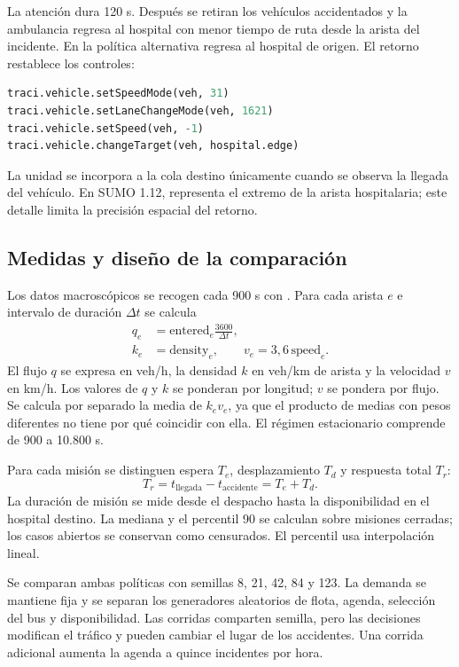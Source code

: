 \documentclass[conference,a4paper]{IEEEtran}
\newcommand{\archivo}[1]{\texttt{\detokenize{#1}}}
\begin{document}
La atención dura 120 s. Después se retiran los vehículos accidentados y la ambulancia regresa al hospital con menor tiempo de ruta desde la arista del incidente. En la política alternativa regresa al hospital de origen. El retorno restablece los controles:
\begin{lstlisting}[language=Python]
traci.vehicle.setSpeedMode(veh, 31)
traci.vehicle.setLaneChangeMode(veh, 1621)
traci.vehicle.setSpeed(veh, -1)
traci.vehicle.changeTarget(veh, hospital.edge)
\end{lstlisting}
La unidad se incorpora a la cola destino únicamente cuando se observa la llegada del vehículo. En SUMO 1.12, \archivo{arrivalPos=max} representa el extremo de la arista hospitalaria; este detalle limita la precisión espacial del retorno.

\subsection{Medidas y diseño de la comparación}
Los datos macroscópicos se recogen cada 900 s con \archivo{edgeData}\cite{macro}. Para cada arista $e$ e intervalo de duración $\Delta t$ se calcula
\begin{align}
q_e&=\mathrm{entered}_e\frac{3600}{\Delta t},\\
k_e&=\mathrm{density}_e,\qquad v_e=3{,}6\,\mathrm{speed}_e.
\end{align}
El flujo $q$ se expresa en veh/h, la densidad $k$ en veh/km de arista y la velocidad $v$ en km/h. Los valores de $q$ y $k$ se ponderan por longitud; $v$ se pondera por flujo. Se calcula por separado la media de $k_e v_e$, ya que el producto de medias con pesos diferentes no tiene por qué coincidir con ella. El régimen estacionario comprende de 900 a 10.800 s.

Para cada misión se distinguen espera $T_e$, desplazamiento $T_d$ y respuesta total $T_r$:
\begin{equation}
T_r=t_{\mathrm{llegada}}-t_{\mathrm{accidente}}=T_e+T_d.
\end{equation}
La duración de misión se mide desde el despacho hasta la disponibilidad en el hospital destino. La mediana y el percentil 90 se calculan sobre misiones cerradas; los casos abiertos se conservan como censurados. El percentil usa interpolación lineal.

Se comparan ambas políticas con semillas 8, 21, 42, 84 y 123. La demanda se mantiene fija y se separan los generadores aleatorios de flota, agenda, selección del bus y disponibilidad. Las corridas comparten semilla, pero las decisiones modifican el tráfico y pueden cambiar el lugar de los accidentes. Una corrida adicional aumenta la agenda a quince incidentes por hora.
\end{document}
